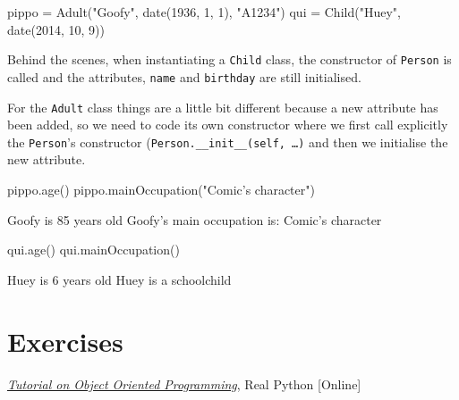 \begin{ipython}
pippo = Adult("Goofy", date(1936, 1, 1), "A1234")
qui = Child("Huey", date(2014, 10, 9))
\end{ipython}

Behind the scenes, when instantiating a \texttt{Child} class, the constructor of \texttt{Person} is called and the attributes, \texttt{name} and \texttt{birthday} are still initialised.  

For the \texttt{Adult} class things are a little bit different because a new attribute has been added, so we need to code its own constructor where we first call explicitly the \texttt{Person}'s constructor (\texttt{Person.\_\_init\_\_(self, \ldots)} and then we initialise the new attribute.

\begin{ipython}
pippo.age()
pippo.mainOccupation("Comic's character")
\end{ipython}
\begin{ioutput}
Goofy is 85 years old
Goofy's main occupation is: Comic's character
\end{ioutput}

\begin{ipython}
qui.age()
qui.mainOccupation()
\end{ipython}
\begin{ioutput}
Huey is 6 years old
Huey is a schoolchild
\end{ioutput}

\section{Exercises}


\begin{thebibliography}{9}
 \href{https://realpython.com/python3-object-oriented-programming/}{\emph{Tutorial on Object Oriented Programming}}, Real Python [Online]
\end{thebibliography}
